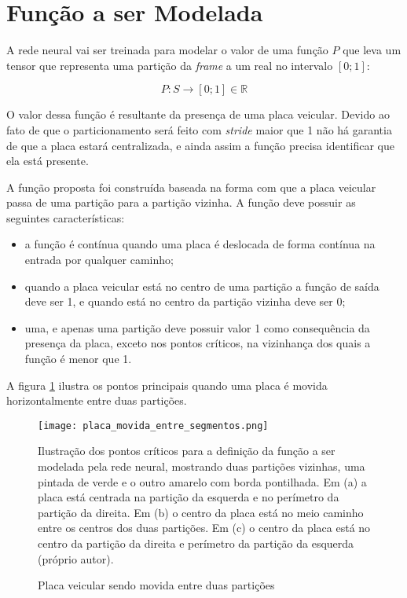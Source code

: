 \section{Função a ser Modelada} \label{ses:funcao_a_modelar}

A rede neural vai ser treinada para modelar o valor de uma função $P$ que
leva um tensor que representa uma partição da \emph{frame} a um real no
intervalo $[0;1]$:

\begin{equation}
	P:S \to [0;1] \in \mathbb{R} 
\end{equation}

O valor dessa função é resultante da presença de uma placa veicular. Devido ao
fato de que o particionamento será feito com \emph{stride} maior que 1 não há
garantia de que a placa estará centralizada, e ainda assim a função precisa
identificar que ela está presente.

A função proposta foi construída baseada na forma com que a placa veicular
passa de uma partição para a partição vizinha. A função deve possuir as
seguintes características:

\begin{itemize}
\item a função é contínua quando uma placa é deslocada de forma contínua na
	entrada por qualquer caminho;
\item quando a placa veicular está no centro de uma partição a função de
	saída deve ser 1, e quando está no centro da partição vizinha deve ser 0;
\item uma, e apenas uma partição deve possuir valor 1 como consequência da
	presença da placa, exceto nos pontos críticos, na vizinhança dos quais a
	função é menor que 1.
\end{itemize}

A figura \ref{fig:placa_movida_entre_segmentos} ilustra os pontos principais
quando uma placa é movida horizontalmente entre duas partições.

\begin{figure}[!htb]
	\centering
	\texttt{[image: placa\_movida\_entre\_segmentos.png]}
	\caption{Placa veicular sendo movida entre duas partições}
	\label{fig:placa_movida_entre_segmentos}
	Ilustração dos pontos críticos para a definição da função a ser modelada
	pela rede neural, mostrando duas partições vizinhas, uma pintada de verde e
	o outro amarelo com borda pontilhada. Em (a) a placa está centrada na
	partição da esquerda e no perímetro da partição da direita.
	Em (b) o centro da placa está no meio caminho entre os centros dos duas
	partições. Em (c) o centro da placa está no centro da partição da direita e
	perímetro da partição da esquerda (próprio autor).
\end{figure}

